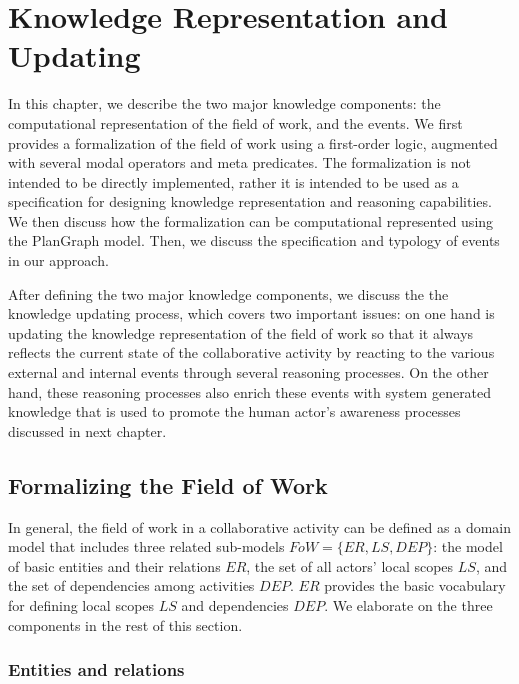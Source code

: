 \graphicspath{{Figures/}}

\chapter{Knowledge Representation and Updating} %
\label{cha:knowledge_reprsentation_and_updating}
In this chapter, we describe the two major knowledge components: the computational representation of the field of work, and the events. We first provides a formalization of the field of work using a first-order logic, augmented with several modal operators and meta predicates. The formalization is not intended to be directly implemented, rather it is intended to be used as a specification for designing knowledge representation and reasoning capabilities. We then discuss how the formalization can be computational represented using the PlanGraph model. Then, we discuss the specification and typology of events in our approach.

After defining the two major knowledge components, we discuss the the knowledge updating process, which covers two important issues: on one hand is updating the knowledge representation of the field of work so that it always reflects the current state of the collaborative activity by reacting to the various external and internal events through several reasoning processes. On the other hand, these reasoning processes also enrich these events with system generated knowledge that is used to promote the human actor's awareness processes discussed in next chapter.

\section{Formalizing the Field of Work} %
\label{sec:formalizaing_the_field_of_work}
In general, the field of work in a collaborative activity can be defined as a domain model that includes three related sub-models $FoW=\{ER, LS, DEP\}$: the model of basic entities and their relations $ER$, the set of all actors' local scopes $LS$, and the set of dependencies among activities $DEP$. $ER$ provides the basic vocabulary for defining local scopes $LS$ and dependencies $DEP$. We elaborate on the three components in the rest of this section. 

\subsection{Entities and relations} %
\label{sub:entities_relations}
